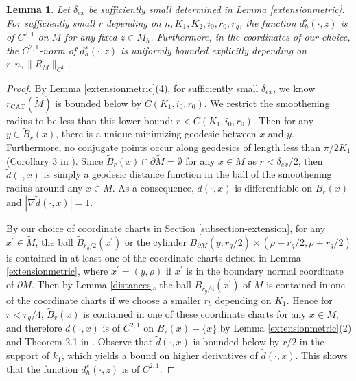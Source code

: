 \documentclass[11pt,letterpaper]{amsart}
\numberwithin{equation}{section}
\theoremstyle{definition}
\theoremstyle{plain}
\theoremstyle{definition}
\theoremstyle{plain}
\newtheorem{dhsC21}[main1]{Lemma}
\theoremstyle{definition}
\theoremstyle{plain}
\begin{document}
\begin{dhsC21}\label{dhsC21}
Let $\delta_{ex}$ be sufficiently small determined in Lemma \ref{extensionmetric}. For sufficiently small $r$ depending on $n,K_1,K_2,i_0,r_0,r_g$, the function $d_h^s(\cdot,z)$ is of $C^{2,1}$ on $M$ for any fixed $z\in M_h$. Furthermore, in the coordinates of our choice, the $C^{2,1}$-norm of $d_h^s(\cdot,z)$ is uniformly bounded explicitly depending on $r,n,\|R_M\|_{C^1}$.
\end{dhsC21}
\begin{proof}
By Lemma \ref{extensionmetric}(4), for sufficiently small $\delta_{ex}$, we know $r_{\textrm{CAT}}(\widetilde{M})$ is bounded below by $C(K_1,i_0,r_0)$. We restrict the smoothening radius to be less than this lower bound: $r<C(K_1,i_0,r_0)$. Then for any $y\in \widetilde{B}_r(x)$, there is a unique minimizing geodesic between $x$ and $y$. Furthermore, no conjugate points occur along geodesics of length less than $\pi/2K_1$ (Corollary 3 in \cite{ABB2}). Since $\widetilde{B}_r(x)\cap \partial \widetilde{M}=\emptyset$ for any $x\in M$ as $r<\delta_{ex}/2$, then $\widetilde{d}(\cdot,x)$ is simply a geodesic distance function in the ball of the smoothening radius around any $x\in M$. As a consequence, $\widetilde{d}(\cdot,x)$ is differentiable on $\widetilde{B}_r(x)$ and $|\nabla \widetilde{d}(\cdot,x)|=1$.

By our choice of coordinate charts in Section \ref{subsection-extension}, for any $x^{\prime}\in \widetilde{M}$, the ball $\widetilde{B}_{r_g/2}(x^{\prime})$ or the cylinder $B_{\partial M}(y,r_g/2)\times (\rho-r_g/2,\rho+r_g/2)$ is contained in at least one of the coordinate charts defined in Lemma \ref{extensionmetric}, where $x^{\prime}=(y,\rho)$ if $x^{\prime}$ is in the boundary normal coordinate of $\partial M$. Then by Lemma \ref{distances}, the ball $\widetilde{B}_{r_g/4}(x^{\prime})$ of $\widetilde{M}$ is contained in one of the coordinate charts if we choose a smaller $r_b$ depending on $K_1$. Hence for $r<r_g/4$, $\widetilde{B}_r(x)$ is contained in one of these coordinate charts for any $x\in M$, and therefore $\widetilde{d}(\cdot,x)$ is of $C^{2,1}$ on $\widetilde{B}_r(x)-\{x\}$ by Lemma \ref{extensionmetric}(2) and Theorem 2.1 in \cite{DK}. Observe that $\widetilde{d}(\cdot,x)$ is bounded below by $r/2$ in the support of $k_1$, which yields a bound on higher derivatives of $\widetilde{d}(\cdot,x)$. This shows that the function $d_h^s(\cdot,z)$ is of $C^{2,1}$.


\end{proof}
\end{document}
